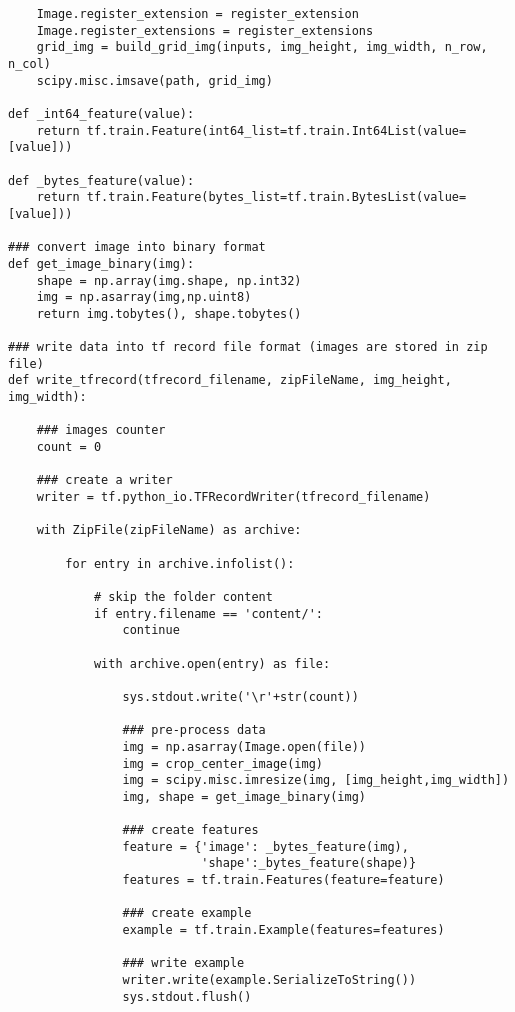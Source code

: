 \begin{footnotesize}
\begin{lstlisting}
    Image.register_extension = register_extension
    Image.register_extensions = register_extensions
    grid_img = build_grid_img(inputs, img_height, img_width, n_row, n_col)
    scipy.misc.imsave(path, grid_img)

def _int64_feature(value):
    return tf.train.Feature(int64_list=tf.train.Int64List(value=[value]))

def _bytes_feature(value):
    return tf.train.Feature(bytes_list=tf.train.BytesList(value=[value]))

### convert image into binary format
def get_image_binary(img):
    shape = np.array(img.shape, np.int32)
    img = np.asarray(img,np.uint8)
    return img.tobytes(), shape.tobytes()

### write data into tf record file format (images are stored in zip file)
def write_tfrecord(tfrecord_filename, zipFileName, img_height, img_width):
    
    ### images counter
    count = 0
    
    ### create a writer
    writer = tf.python_io.TFRecordWriter(tfrecord_filename)
    
    with ZipFile(zipFileName) as archive:
        
        for entry in archive.infolist():
            
            # skip the folder content
            if entry.filename == 'content/':
                continue
                
            with archive.open(entry) as file:
                
                sys.stdout.write('\r'+str(count))
                
                ### pre-process data
                img = np.asarray(Image.open(file))
                img = crop_center_image(img)
                img = scipy.misc.imresize(img, [img_height,img_width])
                img, shape = get_image_binary(img)
                
                ### create features
                feature = {'image': _bytes_feature(img),
                           'shape':_bytes_feature(shape)}
                features = tf.train.Features(feature=feature)
                
                ### create example
                example = tf.train.Example(features=features)
                
                ### write example
                writer.write(example.SerializeToString())
                sys.stdout.flush()
                

\end{lstlisting}
\end{footnotesize}
